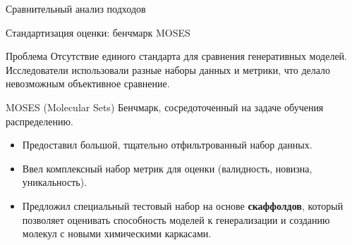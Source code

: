 \documentclass{beamer}
\begin{document}
\begin{frame}{Сравнительный анализ подходов}
    \begin{table}
    \centering
    \end{table}
\end{frame}

\begin{frame}{Стандартизация оценки: бенчмарк MOSES}
    \begin{block}{Проблема}
        Отсутствие единого стандарта для сравнения генеративных моделей. Исследователи использовали разные наборы данных и метрики, что делало невозможным объективное сравнение.
    \end{block}

    \begin{block}{MOSES (Molecular Sets)}
        Бенчмарк, сосредоточенный на задаче обучения распределению.
        \begin{itemize}
            \item Предоставил большой, тщательно отфильтрованный набор данных.
            \item Ввел комплексный набор метрик для оценки (валидность, новизна, уникальность).
            \item Предложил специальный тестовый набор на основе \textbf{скаффолдов}, который позволяет оценивать способность моделей к генерализации и созданию молекул с новыми химическими каркасами.
        \end{itemize}
    \end{block}
\end{frame}
\end{document}

